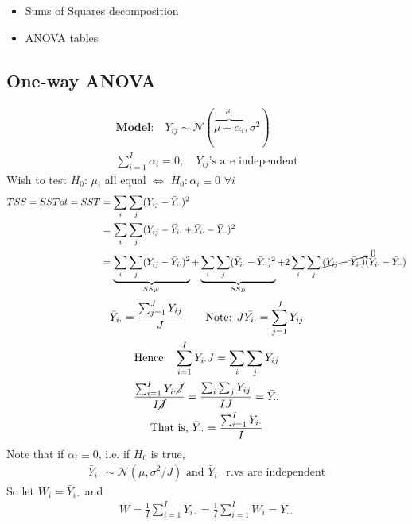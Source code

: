 \begin{itemize}
	\item Sums of Squares decomposition
	\item ANOVA tables
\end{itemize}
\subsection*{One-way ANOVA}
\begin{gather*}
	\textbf{Model:} \quad Y_{ij} \sim \mathcal{N}(\overbrace{\mu + \alpha_i}^{\mu_i}, \sigma^2)\\
	\sum_{i=1}^I \alpha_i = 0, \quad Y_{ij} \text{'s are independent}
\end{gather*}
Wish to test $H_0$: $\mu_i$ all equal $\Leftrightarrow$ $H_0: \alpha_i \equiv 0$ $\forall i$
\begin{align*}
	TSS = SSTot = SST & = \sum_i \sum_j (Y_{ij} - \bar{Y}_{\cdot \cdot})^2\\
	& = \sum_i \sum_j (Y_{ij} - \bar{Y}_{i \cdot} + \bar{Y}_{i \cdot} - \bar{Y}_{\cdot \cdot})^2\\
	& = \underbrace{\sum_i \sum_j (Y_{ij} - \bar{Y}_{i \cdot})^2}_{SS_W} + \underbrace{\sum_i \sum_j (\bar{Y}_{i\cdot} - \bar{Y}_{\cdot \cdot})^2}_{SS_B} + 2 \sum_i \sum_j \cancelto{0}{(Y_{ij} - \bar{Y}_{i \cdot})} (\bar{Y}_{i \cdot} - \bar{Y}_{\cdot \cdot})
\end{align*}
\begin{gather*}
	\bar{Y}_{i \cdot} = \frac{\sum_{j=1}^J Y_{ij}}{J} \qquad \text{Note: } J \bar{Y_{i\cdot}} = \sum_{j=1}^J Y_{ij}\\
	\text{Hence} \quad \sum_{i=1}^I Y_{i \cdot } J = \sum_i \sum_j Y_{ij}\\
	\frac{\sum_{i=1}^I Y_{i \cdot } \cancel{J}}{I \cancel{J}} = \frac{\sum_i \sum_j Y_{ij}}{IJ} = \bar{Y}_{\cdot \cdot}\\
	\text{That is, } \bar{Y}_{\cdot \cdot} = \frac{\sum_{i=1}^I \bar{Y}_{i \cdot} }{I}
\end{gather*}
Note that if $\alpha_i \equiv 0$, i.e. if $H_0$ is true, 
\begin{gather*}
	\bar{Y}_{i\cdot} \sim \mathcal{N}(\mu, \sigma^2/J) \text{ and $\bar{Y}_{i\cdot}$ r.vs are independent}
\end{gather*}
So let $W_i = \bar{Y}_{i\cdot}$ and 
\begin{gather*}
	\bar{W} = \frac{1}{I} \sum_{i=1}^I \bar{Y}_{i \cdot} = \frac{1}{I} \sum_{i=1}^I W_i = \bar{Y}_{\cdot \cdot}
\end{gather*}
